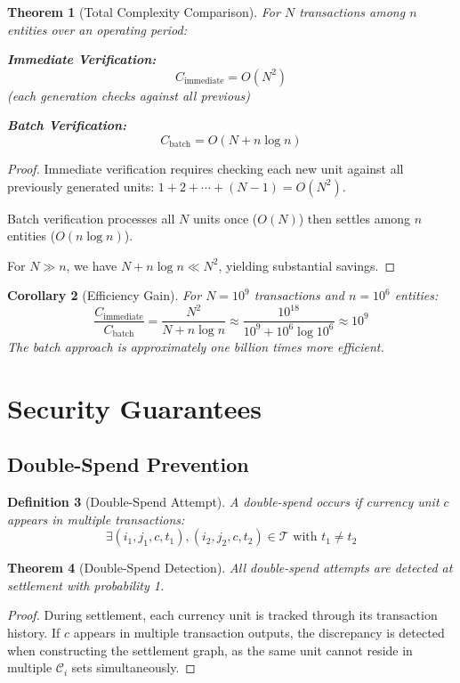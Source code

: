 \documentclass[12pt]{article}
\newtheorem{theorem}{Theorem}
\newtheorem{definition}[theorem]{Definition}
\newtheorem{corollary}[theorem]{Corollary}
\begin{document}
\begin{theorem}[Total Complexity Comparison]
For $N$ transactions among $n$ entities over an operating period:

\textbf{Immediate Verification:}
$$
C_{\text{immediate}} = O(N^2)
$$
(each generation checks against all previous)

\textbf{Batch Verification:}
$$
C_{\text{batch}} = O(N + n\log n)
$$
\end{theorem}

\begin{proof}
Immediate verification requires checking each new unit against all previously generated units: $1 + 2 + \cdots + (N-1) = O(N^2)$.

Batch verification processes all $N$ units once ($O(N)$) then settles among $n$ entities ($O(n\log n)$).

For $N \gg n$, we have $N + n\log n \ll N^2$, yielding substantial savings.
\end{proof}

\begin{corollary}[Efficiency Gain]
For $N = 10^9$ transactions and $n = 10^6$ entities:
$$
\frac{C_{\text{immediate}}}{C_{\text{batch}}} = \frac{N^2}{N + n\log n} \approx \frac{10^{18}}{10^9 + 10^6 \log 10^6} \approx 10^9
$$
The batch approach is approximately one billion times more efficient.
\end{corollary}

\section{Security Guarantees}

\subsection{Double-Spend Prevention}

\begin{definition}[Double-Spend Attempt]
A double-spend occurs if currency unit $c$ appears in multiple transactions:
$$
\exists (i_1, j_1, c, t_1), (i_2, j_2, c, t_2) \in \mathcal{T} \text{ with } t_1 \neq t_2
$$
\end{definition}

\begin{theorem}[Double-Spend Detection]
All double-spend attempts are detected at settlement with probability 1.
\end{theorem}

\begin{proof}
During settlement, each currency unit is tracked through its transaction history. If $c$ appears in multiple transaction outputs, the discrepancy is detected when constructing the settlement graph, as the same unit cannot reside in multiple $\mathcal{C}_i$ sets simultaneously.
\end{proof}
\end{document}
